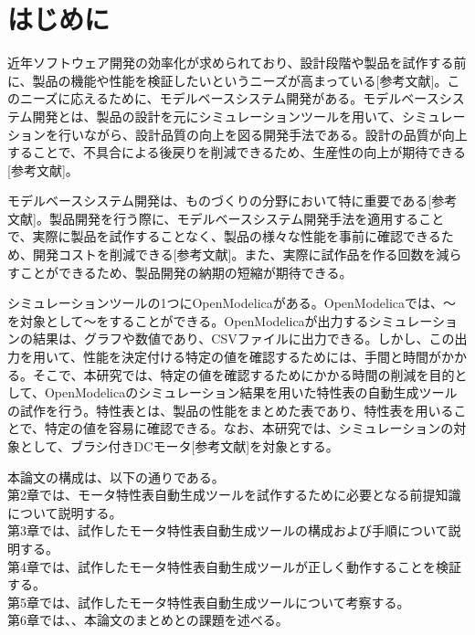\chapter{はじめに}\label{cha:Introduction}
近年ソフトウェア開発の効率化が求められており、設計段階や製品を試作する前に、製品の機能や性能を検証したいというニーズが高まっている[参考文献]。このニーズに応えるために、モデルベースシステム開発がある。モデルベースシステム開発とは、製品の設計を元にシミュレーションツールを用いて、シミュレーションを行いながら、設計品質の向上を図る開発手法である。設計の品質が向上することで、不具合による後戻りを削減できるため、生産性の向上が期待できる[参考文献]。

モデルベースシステム開発は、ものづくりの分野において特に重要である[参考文献]。製品開発を行う際に、モデルベースシステム開発手法を適用することで、実際に製品を試作することなく、製品の様々な性能を事前に確認できるため、開発コストを削減できる[参考文献]。また、実際に試作品を作る回数を減らすことができるため、製品開発の納期の短縮が期待できる。

シミュレーションツールの1つにOpenModelicaがある。OpenModelicaでは、～を対象として～をすることができる。OpenModelicaが出力するシミュレーションの結果は、グラフや数値であり、CSVファイルに出力できる。しかし、この出力を用いて、性能を決定付ける特定の値を確認するためには、手間と時間がかかる。そこで、本研究では、特定の値を確認するためにかかる時間の削減を目的として、OpenModelicaのシミュレーション結果を用いた特性表の自動生成ツールの試作を行う。特性表とは、製品の性能をまとめた表であり、特性表を用いることで、特定の値を容易に確認できる。なお、本研究では、シミュレーションの対象として、ブラシ付きDCモータ[参考文献]を対象とする。



本論文の構成は、以下の通りである。\\
第2章では、モータ特性表自動生成ツールを試作するために必要となる前提知識について説明する。\\
第3章では、試作したモータ特性表自動生成ツールの構成および手順について説明する。\\
第4章では、試作したモータ特性表自動生成ツールが正しく動作することを検証する。\\
第5章では、試作したモータ特性表自動生成ツールについて考察する。\\
第6章では、、本論文のまとめとの課題を述べる。\\